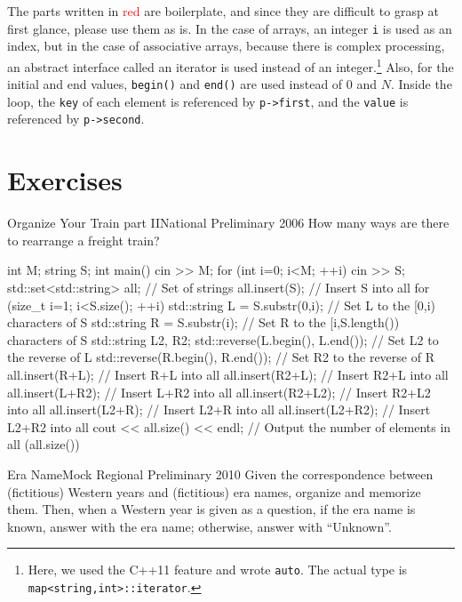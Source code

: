 The parts written in \textcolor{red}{red} are boilerplate, and since they are difficult to grasp at first glance, please use them as is. In the case of arrays, an integer \texttt{i} is used as an index, but in the case of associative arrays, because there is complex processing, an abstract interface called an iterator is used instead of an integer.\footnote{Here, we used the C++11 feature and wrote \texttt{auto}. The actual type is \texttt{map<string,int>::iterator}.} Also, for the initial and end values, \texttt{begin()} and \texttt{end()} are used instead of $0$ and $N$. Inside the loop, the \texttt{key} of each element is referenced by \texttt{p->first}, and the \texttt{value} is referenced by \texttt{p->second}.
\section{Exercises}
\begin{pbox}{Organize Your Train part II}{National Preliminary 2006}
How many ways are there to rearrange a freight train?

\end{pbox}

\begin{cbox}
int M;
string S;
int main() {
    cin >> M;
    for (int i=0; i<M; ++i) {
        cin >> S;
        std::set<std::string> all; // Set of strings
        all.insert(S); // Insert S into all
        for (size_t i=1; i<S.size(); ++i) {
            std::string L = S.substr(0,i); // Set L to the [0,i) characters of S
            std::string R = S.substr(i); // Set R to the [i,S.length()) characters of S
            std::string L2, R2;
            std::reverse(L.begin(), L.end()); // Set L2 to the reverse of L
            std::reverse(R.begin(), R.end()); // Set R2 to the reverse of R
            all.insert(R+L); // Insert R+L into all
            all.insert(R2+L); // Insert R2+L into all
            all.insert(L+R2); // Insert L+R2 into all
            all.insert(R2+L2); // Insert R2+L2 into all
            all.insert(L2+R); // Insert L2+R into all
            all.insert(L2+R2); // Insert L2+R2 into all
        }
        cout << all.size() << endl; // Output the number of elements in all (all.size())
    }
}  
\end{cbox}

\begin{pbox}{Era Name}{Mock Regional Preliminary 2010}
Given the correspondence between (fictitious) Western years and (fictitious) era names, organize and memorize them.
Then, when a Western year is given as a question, if the era name is known, answer with the era name; otherwise, answer with ``Unknown''.

\end{pbox}

